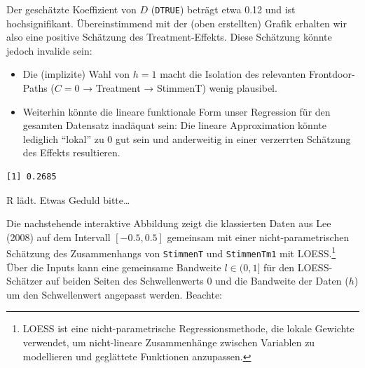 \documentclass[
  letterpaper,
  DIV=11,
  oneside]{scrreprt}
\newenvironment{Shaded}{\begin{snugshade}}{\end{snugshade}}
\newcommand{\AttributeTok}[1]{\textcolor[rgb]{0.40,0.45,0.13}{#1}}
\newcommand{\DecValTok}[1]{\textcolor[rgb]{0.68,0.00,0.00}{#1}}
\newcommand{\FunctionTok}[1]{\textcolor[rgb]{0.28,0.35,0.67}{#1}}
\newcommand{\NormalTok}[1]{\textcolor[rgb]{0.00,0.23,0.31}{#1}}
\newcommand{\SpecialCharTok}[1]{\textcolor[rgb]{0.37,0.37,0.37}{#1}}
\begin{document}
\hypertarget{webr-code-output-4}{}

Der geschätzte Koeffizient von \(D\) (\texttt{DTRUE}) beträgt etwa 0.12
und ist hochsignifikant. Übereinstimmend mit der (oben erstellten)
Grafik erhalten wir also eine positive Schätzung des Treatment-Effekts.
Diese Schätzung könnte jedoch invalide sein:

\begin{itemize}
\item
  Die (implizite) Wahl von \(h=1\) macht die Isolation des relevanten
  Frontdoor-Paths (\(C=0\) → Treatment → StimmenT) wenig plausibel.
\item
  Weiterhin könnte die lineare funktionale Form unser Regression für den
  gesamten Datensatz inadäquat sein: Die lineare Approximation könnte
  lediglich ``lokal'' zu 0 gut sein und anderweitig in einer verzerrten
  Schätzung des Effekts resultieren.
\end{itemize}

\begin{Shaded}
\end{Shaded}

\begin{verbatim}
[1] 0.2685
\end{verbatim}

R lädt. Etwas Geduld bitte\ldots{}

\hypertarget{webr-editor-5}{}

\hypertarget{webr-code-output-5}{}

Die nachstehende interaktive Abbildung zeigt die klassierten Daten aus
Lee (2008) auf dem Intervall \([-0.5,0.5]\) gemeinsam mit einer
nicht-parametrischen Schätzung des Zusammenhangs von \texttt{StimmenT}
und \texttt{StimmenTm1} mit LOESS.\footnote{LOESS ist eine
  nicht-parametrische Regressionsmethode, die lokale Gewichte verwendet,
  um nicht-lineare Zusammenhänge zwischen Variablen zu modellieren und
  geglättete Funktionen anzupassen.} Über die Inputs kann eine
gemeinsame Bandweite \(l\in(0,1]\) für den LOESS-Schätzer auf beiden
Seiten des Schwellenwerts 0 und die Bandweite der Daten (\(h\)) um den
Schwellenwert angepasst werden. Beachte:
\end{document}
